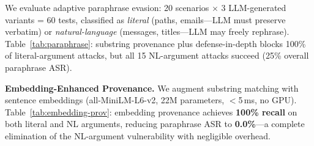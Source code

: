 We evaluate adaptive paraphrase evasion: 20 scenarios $\times$ 3 LLM-generated variants = 60 tests, classified as \emph{literal} (paths, emails---LLM must preserve verbatim) or \emph{natural-language} (messages, titles---LLM may freely rephrase). Table~\ref{tab:paraphrase}: substring provenance plus defense-in-depth blocks 100\% of literal-argument attacks, but all 15 NL-argument attacks succeed (25\% overall paraphrase ASR).

\textbf{Embedding-Enhanced Provenance.} We augment substring matching with sentence embeddings (all-MiniLM-L6-v2, 22M parameters, $<$5\,ms, no GPU). Table~\ref{tab:embedding-prov}: embedding provenance achieves \textbf{100\% recall} on both literal and NL arguments, reducing paraphrase ASR to \textbf{0.0\%}---a complete elimination of the NL-argument vulnerability with negligible overhead.

